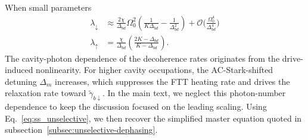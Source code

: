 When small parameters
\begin{align}
\lambda_\downarrow &\approx \frac{2\chi}{\Delta_{bd}} \Omega_0^2 \left( \frac{1}{K\Delta_{bd}} - \frac{1}{\Delta_{bd}^2} \right) + \mathcal{O}\bigg(\frac{\Omega^4_0}{\Delta^4_{bd}}\bigg) \\
\lambda_\uparrow &= \frac{\chi}{\Delta_{bd}} \left( \frac{2K - \Delta_{bd}}{K - \Delta_{bd}} \right).
\end{align}
The cavity-photon dependence of the decoherence rates originates from the drive-induced nonlinearity. For higher cavity occupations, the AC-Stark-shifted detuning $\Delta_m$ increases, which suppresses the FTT heating rate and drives the relaxation rate toward $\widetilde{\gamma}_{b\downarrow}$. In the main text, we neglect this photon-number dependence to keep the discussion focused on the leading scaling. Using Eq.~\eqref{eq:ss_unselective}, we then recover the simplified master equation quoted in subsection~\ref{subsec:unselective-dephasing}.


